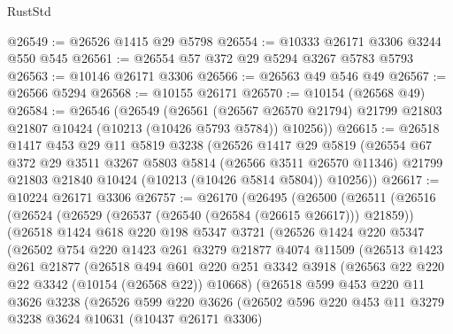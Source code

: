 \begin{lexlean}{RustStd}
\begin{coremodule}
@26549 := @26526 @1415 @29 @5798
@26554 := @10333 @26171 @3306 @3244 @550 @545
@26561 := @26554 @57 @372 @29 @5294 @3267 @5783 @5793
@26563 := @10146 @26171 @3306
@26566 := @26563 @49 @546 @49
@26567 := @26566 @5294
@26568 := @10155 @26171
@26570 := @10154 (@26568 @49)
@26584 := @26546
    (@26549
      (@26561
        (@26567 @26570 @21794)
        @21799
        @21803
        @21807
        @10424
        (@10213 (@10426 @5793 @5784))
        @10256))
@26615 := @26518
    @1417
    @453
    @29
    @11
    @5819
    @3238
    (@26526
      @1417
      @29
      @5819
      (@26554
        @67
        @372
        @29
        @3511
        @3267
        @5803
        @5814
        (@26566 @3511 @26570 @11346)
        @21799
        @21803
        @21840
        @10424
        (@10213 (@10426 @5814 @5804))
        @10256))
@26617 := @10224 @26171 @3306
@26757 := @26170
    (@26495
      (@26500
        (@26511
          (@26516
            (@26524
              (@26529 (@26537 (@26540 (@26584 (@26615 @26617))) @21859))
              (@26518
                @1424
                @618
                @220
                @198
                @5347
                @3721
                (@26526
                  @1424
                  @220
                  @5347
                  (@26502
                    @754
                    @220
                    @1423
                    @261
                    @3279
                    @21877
                    @4074
                    @11509
                    (@26513
                      @1423
                      @261
                      @21877
                      (@26518
                        @494
                        @601
                        @220
                        @251
                        @3342
                        @3918
                        (@26563 @22 @220 @22 @3342 (@10154 (@26568 @22)) @10668)
                        (@26518
                          @599
                          @453
                          @220
                          @11
                          @3626
                          @3238
                          (@26526
                            @599
                            @220
                            @3626
                            (@26502
                              @596
                              @220
                              @453
                              @11
                              @3279
                              @3238
                              @3624
                              @10631
                              (@10437 @26171 @3306)

\end{coremodule}
\end{lexlean}
